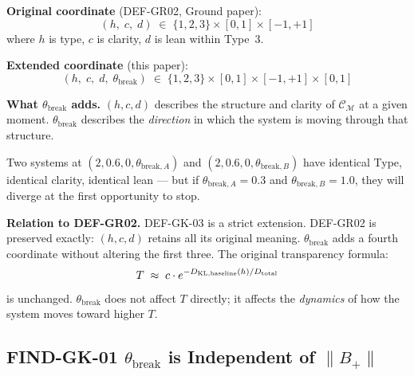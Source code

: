 \documentclass[12pt, a4paper]{article}
\providecommand{\Bplus}{B_{+}}
\providecommand{\tbreak}{\theta_{\mathrm{break}}}
\begin{document}

\begin{formalbox}[title={DEF-GK-03: Extended Mind Coordinate
  $(h, c, d, \tbreak)$ (NEW)}]
\textbf{Original coordinate} (DEF-GR02, Ground paper):
\[
  (h,\;c,\;d) \;\in\; \{1,2,3\}\times[0,1]\times[-1,+1]
\]
where $h$ is type, $c$ is clarity, $d$ is lean within Type~3.

\textbf{Extended coordinate} (this paper):
\[
  \boxed{(h,\;c,\;d,\;\tbreak)
  \;\in\; \{1,2,3\}\times[0,1]\times[-1,+1]\times[0,1]}
\]

\textbf{What $\tbreak$ adds.}
$(h,c,d)$ describes the structure and clarity of
$\mathcal{C}_\mathcal{M}$ at a given moment.
$\tbreak$ describes the \emph{direction} in which
the system is moving through that structure.

Two systems at $(2, 0.6, 0, \theta_{\mathrm{break},A})$ and
$(2, 0.6, 0, \theta_{\mathrm{break},B})$ have identical Type,
identical clarity, identical lean --- but if
$\theta_{\mathrm{break},A} = 0.3$ and $\theta_{\mathrm{break},B} = 1.0$, they
will diverge at the first opportunity to stop.

\textbf{Relation to DEF-GR02.}
DEF-GK-03 is a strict extension. DEF-GR02 is
preserved exactly: $(h,c,d)$ retains all its
original meaning. $\tbreak$ adds a fourth
coordinate without altering the first three.
The original transparency formula:
\[
  T \;\approx\; c \cdot e^{-D_{\rm KL,baseline}(h)/D_{\rm total}}
\]
is unchanged. $\tbreak$ does not affect $T$ directly;
it affects the \emph{dynamics} of how the system
moves toward higher $T$.
\end{formalbox}

\subsection{FIND-GK-01 \quad \texorpdfstring{$\tbreak$}{math} is Independent of \texorpdfstring{$\|\Bplus\|$}{\|\|}}

\end{document}
